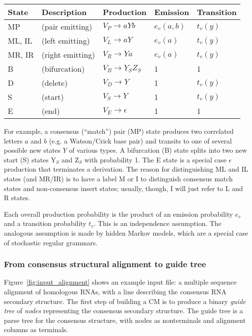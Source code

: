 \documentclass[11pt]{article}
\begin{document}
\vspace{0.5em}
\begin{tabular}{lllll}
State  & Description             &  Production             & Emission & Transition\\ \hline
MP  & (pair emitting)           & $V_P \rightarrow a Y b$ & $e_v(a,b)$ & $t_v(y)$  \\
ML, IL & (left emitting)       & $V_L \rightarrow a Y$   & $e_v(a)$   & $t_v(y)$  \\
MR, IR & (right emitting)      & $V_R \rightarrow Y a$   & $e_v(a)$   & $t_v(y)$  \\
B &  (bifurcation)    & $V_B \rightarrow Y_S Z_S$  & 1     &     1     \\
D & (delete)         & $V_D \rightarrow Y$     &    1     &   $t_v(y)$  \\
S & (start)          & $V_S \rightarrow Y$     &    1     &   $t_v(y)$  \\
E & (end)            & $V_E \rightarrow \epsilon$ & 1     &     1     \\
\end{tabular}
\vspace{0.5em}

For example, a consensus (``match'') pair (MP) state produces two
correlated letters $a$ and $b$ (e.g. a Watson/Crick base pair) and
transits to one of several possible new states $Y$ of various types.
A bifurcation (B) state splits into two new start (S) states Y$_{S}$
and Z$_{S}$ with probability 1.  The E state is a special case
$\epsilon$ production that terminates a derivation. The reason for
distinguishing ML and IL states (and MR/IR) is to have a label M or I
to distinguish consensus match states and non-consensus insert states;
usually, though, I will just refer to L and R states.

Each overall production probability is the product of an emission
probability $e_v$ and a transition probability $t_v$. This is an
independence assumption. The analogous assumption is made by hidden
Markov models, which are a special case of stochastic regular
grammars.

\subsubsection{From consensus structural alignment to guide tree}

Figure~\ref{fig:input_alignment} shows an example input file: a
multiple sequence alignment of homologous RNAs, with a line describing
the consensus RNA secondary structure. The first step of building a CM
is to produce a binary \emph{guide tree} of \emph{nodes} representing
the consensus secondary structure. The guide tree is a parse tree for
the consensus structure, with nodes as nonterminals and alignment
columns as terminals.
\end{document}
